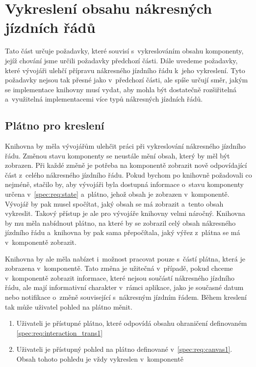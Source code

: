 \section{Vykreslení obsahu nákresných jízdních řádů}
\label{kap:spec:obsah_njr}
Tato část určuje požadavky, které souvisí s~vykreslováním obsahu komponenty, jejíž chování jsme určili požadavky předchozí části. Dále uvedeme požadavky, které vývojáři ulehčí přípravu nákresného jízdního řádu k~jeho vykreslení. Tyto požadavky nejsou tak přesné jako v~předchozí části, ale spíše určují směr, jakým se implementace knihovny musí vydat, aby mohla být dostatečně rozšiřitelná a~využitelná implementacemi více typů nákresných jízdních řádů.

\subsection*{Plátno pro kreslení}
Knihovna by měla vývojářům ulehčit práci při vykreslování nákresného jízdního řádu. Změnou stavu komponenty se neustále mění obsah, který by měl být zobrazen. Při každé změně je potřeba na komponentě zobrazit nově odpovídající část z~celého nákresného jízdního řádu. Pokud bychom po knihovně požadovali co nejméně, stačilo by, aby vývojáři byla dostupná informace o~stavu komponenty určena v~\ref{spec:req:state} a~plátno, jehož obsah je zobrazen v~komponentě. Vývojář by pak musel spočítat, jaký obsah se má zobrazit a~tento obsah vykreslit. Takový přístup je ale pro vývojáře knihovny velmi náročný. Knihovna by mu měla nabídnout plátno, na které by se zobrazil celý obsah nákresného jízdního řádu a~knihovna by pak sama přepočítala, jaký výřez z~plátna se má v~komponentě zobrazit.

Knihovna by ale měla nabízet i~možnost pracovat pouze s~částí plátna, která je zobrazena v~komponentě. Tato změna je užitečná v~případě, pokud chceme v~komponentě zobrazit informace, které nejsou součástí nákresného jízdního řádu, ale mají informativní charakter v~rámci aplikace, jako je současné datum nebo notifikace o~změně související s~nákresným jízdním řádem. Během kreslení tak může uživatel pohled na plátno měnit.

\begin{enumerate}[label=\color{reqcolor}\textbf{R{\arabic*}},resume]
	\item \label{spec:req:canvas1} Uživateli je přístupné plátno, které odpovídá obsahu ohraničení definovaném \ref{spec:req:interaction_trans1}
	\item \label{spec:req:canvas2} Uživateli je přístupný pohled na plátno definované v~\ref{spec:req:canvas1}. Obsah tohoto pohledu je vždy vykreslen v~komponentě
\end{enumerate}

